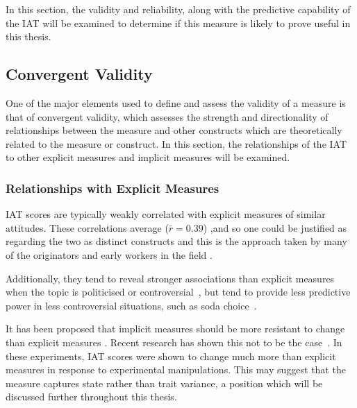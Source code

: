 In this section, the validity and reliability, along with the predictive capability of the IAT will be examined to determine if this measure is likely to prove useful in this thesis. 

\subsection{Convergent Validity}
\label{sec:convergent-validity}

One of the major elements used to define and assess the validity of a measure is that of convergent validity, which assesses the strength and directionality of relationships between the measure and other constructs which are theoretically related to the measure or construct. In this section, the relationships of the IAT to other explicit measures and implicit measures will be examined. 


\subsubsection{Relationships with Explicit Measures}
\label{sec:relat-with-expl}



IAT scores are typically weakly correlated with explicit measures of similar attitudes. These correlations average ($\bar r=0.39$) \cite{Nosek2005},and so one could be justified as regarding the two as distinct constructs \cite{Nosek2007a} and this is the approach taken by many of the originators and early workers in the field \cite{Greenwald2000,Nosek2007a}. 

Additionally, they tend to reveal stronger associations than explicit measures when the topic is politicised or controversial~\cite{Greenwald2009}, but tend to provide less predictive power in less controversial situations, such as soda choice~\cite{Karpinski2006}.


It has been proposed that implicit measures should be more resistant to change than explicit measures \cite{Greenwald1995a,Greenwald1998}. Recent research has shown this not to be the case~\cite{Meagher2004,Gschwendner2008}. In these experiments, IAT scores were shown to change much more than explicit measures in response to experimental manipulations. This may suggest that the measure captures state rather than trait variance, a position which will be discussed further throughout this thesis. 

